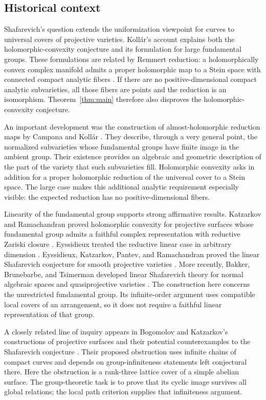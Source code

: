 \documentclass[11pt,reqno]{amsart}
\numberwithin{equation}{section}
\theoremstyle{definition}
\theoremstyle{remark}
\begin{document}
\subsection{Historical context}
Shafarevich's question extends the uniformization viewpoint for curves
to universal covers of projective varieties.  Koll\'ar's account
\cite[Introduction, Section~0.3]{Kollar1995} explains both the
holomorphic-convexity conjecture and its formulation for large
fundamental groups.  These formulations are related by Remmert
reduction: a holomorphically convex complex manifold admits a proper
holomorphic map to a Stein space with connected compact analytic
fibers \cite[Introduction, p.~1546]{EKPR2012}.  If there are no positive-dimensional
compact analytic subvarieties, all those fibers are points and the
reduction is an isomorphism.  Theorem~\ref{thm:main} therefore also
disproves the holomorphic-convexity conjecture.

An important development was the construction of almost-holomorphic reduction maps by
Campana and Koll\'ar \cite{Campana1994,Kollar1993,Kollar1995}.
They describe, through a very general point, the normalized subvarieties
whose fundamental groups have finite image in the ambient group.
Their existence provides an algebraic
and geometric description of the part of the variety that such
subvarieties fill.  Holomorphic convexity asks in addition for a
proper holomorphic reduction of the universal cover to a Stein space.
The large case makes this additional analytic requirement especially
visible: the expected reduction has no positive-dimensional fibers.

Linearity of the fundamental group supports strong affirmative
results.  Katzarkov and Ramachandran proved holomorphic convexity for
projective surfaces whose fundamental group admits a faithful complex
representation with reductive Zariski closure
\cite{KatzarkovRamachandran1998}.  Eyssidieux treated the reductive
linear case in arbitrary dimension \cite{Eyssidieux2004}.
Eyssidieux, Katzarkov, Pantev, and
Ramachandran proved the linear Shafarevich conjecture for smooth
projective varieties \cite{EKPR2012}.  More recently, Bakker,
Brunebarbe, and Tsimerman developed linear Shafarevich theory for
normal algebraic spaces and quasiprojective varieties
\cite{BBT2024}.  The construction here concerns the unrestricted
fundamental group.  Its infinite-order argument uses compatible
local covers of an arrangement, so it does not require a faithful
linear representation of that group.

A closely related line of inquiry appears in Bogomolov and Katzarkov's
constructions of projective surfaces and their potential counterexamples
to the Shafarevich conjecture
\cite[Section~4]{BogomolovKatzarkov1998}.  Their proposed obstruction
uses infinite chains of compact curves and depends on group-infiniteness
statements left conjectural there.
Here the obstruction is a rank-three lattice cover of a simple abelian
surface.  The group-theoretic task is to prove that its cyclic image
survives all global relations; the local path criterion supplies that
infiniteness argument.
\end{document}
